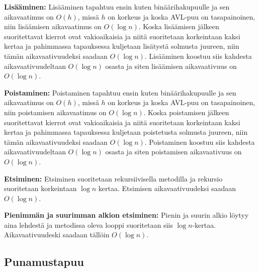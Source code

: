 \documentclass[12pt,a4paper,leqno,titlepage,twoside]{article}
\begin{document}
\begin{description}
\item{\textbf{Lisääminen:}} Lisääminen tapahtuu ensin kuten binäärihakupuulle
ja sen aikavaatimus on $O(h)$, missä $h$ on korkeus ja koska AVL-puu on tasapainoinen,
niin lisäämisen aikavaatimus on $O(\log n)$. Koska lisäämisen jälkeen suoritettavat
kierrot ovat vakioaikaisia ja niitä suoritetaan korkeintaan kaksi kertaa ja pahimmassa
tapauksessa kuljetaan lisätystä solmusta juureen, niin tämän aikavaativuudeksi
saadaan $O(\log n)$. Lisääminen koostuu siis kahdesta aikavaativuudeltaan $O(\log n)$
osasta ja siten lisäämisen aikavaativuus on $O(\log n)$.

\item{\textbf{Poistaminen:}} Poistaminen tapahtuu ensin kuten binäärihakupuulle
ja sen aikavaatimus on $O(h)$, missä $h$ on korkeus ja koska AVL-puu on tasapainoinen,
niin poistamisen aikavaatimus on $O(\log n)$. Koska poistamisen jälkeen suoritettavat
kierrot ovat vakioaikaisia ja niitä suoritetaan korkeintaan kaksi kertaa ja pahimmassa
tapauksessa kuljetaan poistetusta solmusta juureen, niin tämän aikavaativuudeksi
saadaan $O(\log n)$. Poistaminen koostuu siis kahdesta aikavaativuudeltaan $O(\log n)$
osasta ja siten poistamisen aikavaativuus on $O(\log n)$.

\item{\textbf{Etsiminen:}} Etsiminen suoritetaan rekursiivisella metodilla ja
rekursio suoritetaan korkeintaan $\log n$ kertaa. Etsimisen aikavaativuudeksi
saadaan $O(\log n)$.

\item{\textbf{Pienimmän ja suurimman alkion etsiminen:}} Pienin ja suurin alkio
löytyy aina lehdestä ja metodissa oleva looppi suoritetaan siis $\log n$-kertaa.
Aikavaativuudeski saadaan tällöin $O(\log n)$.
\end{description}

\subsection*{Punamustapuu}
\end{document}
